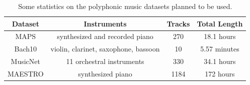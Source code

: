 \begin{table}
	\centering
	\begin{tabular}{|c|c|c|c|} \hline
		Dataset & Instruments & Tracks & Total Length \\ \hline
		MAPS & synthesized and recorded piano & 270 & 18.1 hours \\ \hline
		Bach10 & violin, clarinet, saxophone, bassoon & 10 & 5.57 minutes \\ \hline
		MusicNet & 11 orchestral instruments & 330 & 34.1 hours \\ \hline
		MAESTRO & synthesized piano & 1184 & 172 hours \\ \hline
	\end{tabular}
	\vspace{1em}
	\caption{Some statistics on the polyphonic music datasets planned to be used.}
	\label{tab:dataset-stats}
\end{table}
